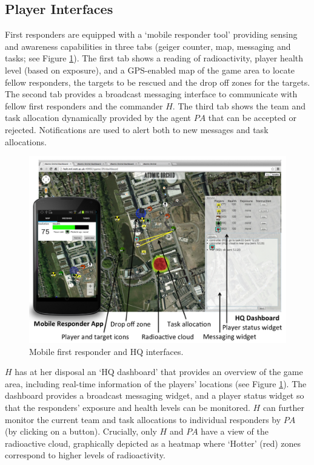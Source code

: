 \subsection{Player Interfaces}
\noindent First responders are equipped with a `mobile responder tool' providing sensing and awareness capabilities in three tabs (geiger counter, map, messaging and tasks; see Figure \ref{fig:ui}). The first tab shows a reading of radioactivity, player health level (based on exposure), and a GPS-enabled map of the game area to locate fellow responders, the targets to be rescued and the drop off zones for the targets. The second tab provides a broadcast messaging interface to communicate with fellow first responders and the commander $H$. The third tab shows the team and task allocation dynamically provided by the agent $PA$ that can be accepted or rejected. Notifications are used to alert both to new messages and task allocations.

\begin{figure}[htbp]
\includegraphics[width=\columnwidth]{UI.png}
\caption{Mobile first responder and HQ interfaces.\vspace{-3mm}
\label{fig:ui}
}\end{figure}

$H$ has at her disposal an `HQ dashboard' that provides an overview of the game area, including real-time information of the players' locations (see Figure \ref{fig:ui}). The dashboard provides a broadcast messaging widget, and a player status widget so that the responders' exposure and health levels can be monitored. $H$ can further monitor the  current team and task allocations to individual responders by $PA$ (by clicking on a button). Crucially, only $H$ and $PA$ have a view of the radioactive cloud, graphically depicted as a heatmap where `Hotter'  (red) zones correspond to higher levels of radioactivity.

